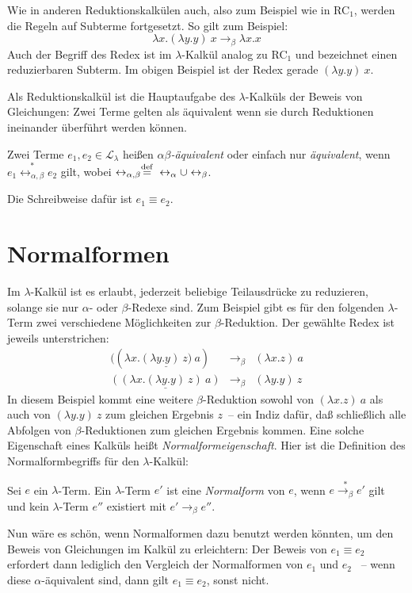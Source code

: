 Wie in anderen Reduktionskalkülen auch, also zum Beispiel wie in
RC$_1$, werden die Regeln auf Subterme fortgesetzt.  So gilt zum
Beispiel:
%
\begin{displaymath}
  \lambda x.(\lambda y.y)~x \rightarrow_{\beta} \lambda x.x
\end{displaymath}
%
Auch der Begriff des Redex ist im $\lambda$-Kalkül analog zu RC$_1$
und bezeichnet einen reduzierbaren Subterm.  Im obigen Beispiel ist
der Redex gerade $(\lambda y.y)~x$.

Als Reduktionskalkül ist die Hauptaufgabe des $\lambda$-Kalküls der
Beweis von Gleichungen: Zwei Terme gelten als äquivalent wenn
sie durch Reduktionen ineinander überführt werden können.
%
\begin{definition}
  Zwei Terme $e_1, e_2\in\mathcal{L}_{\lambda}$ heißen
  \textit{$\alpha\beta$-äquivalent} oder einfach nur
  \textit{äquivalent}, wenn
  \(e_1 \overset{\ast}{\leftrightarrow_{\alpha,\beta}} e_2\)
  gilt, wobei \(\leftrightarrow_{\alpha,\beta} \stackrel{\rm def}{=}{}
  \leftrightarrow_{\alpha} \cup \leftrightarrow_{\beta}\).

  Die Schreibweise dafür ist \(e_1\equiv e_2\).
\end{definition}

\section{Normalformen}
\label{sec:normalformen}

Im $\lambda$-Kalkül ist es erlaubt,
jederzeit beliebige Teilausdrücke zu reduzieren, solange sie nur
$\alpha$- oder $\beta$-Redexe sind.  Zum Beispiel gibt es für den
folgenden $\lambda$-Term zwei verschiedene Möglichkeiten zur
$\beta$-Reduktion.  Der gewählte Redex ist jeweils unterstrichen:
%
\begin{eqnarray*}
  ((\lambda x.\underline{(\lambda y.y)~z)}~a) &\rightarrow_{\beta}& (\lambda x.z)~a\\
  \underline{((\lambda x.(\lambda y.y)~z)~a)} &\rightarrow_{\beta}& (\lambda y.y)~z
\end{eqnarray*}
%
In diesem Beispiel kommt eine weitere
$\beta$-Reduktion sowohl von $(\lambda x.z)~a$ als auch von $(\lambda
y.y)~z$ zum gleichen Ergebnis $z$~-- ein Indiz
dafür, daß schließlich alle Abfolgen von $\beta$-Reduktionen zum
gleichen Ergebnis kommen.  Eine solche Eigenschaft eines Kalküls heißt
\textit{Normalformeigenschaft}.  Hier ist die Definition des
Normalformbegriffs für den $\lambda$-Kalkül:
%
\begin{definition}[Normalform]
  Sei $e$ ein $\lambda$-Term.  Ein $\lambda$-Term $e'$ ist eine
  \textit{Normalform} von $e$, wenn
  $e\overset{\ast}{\rightarrow_\beta}e'$ gilt und kein $\lambda$-Term
  $e''$ existiert mit
  $e'\rightarrow_\beta e''$.
\end{definition}
%
Nun wäre es schön, wenn Normalformen dazu benutzt werden könnten, um
den Beweis von Gleichungen im Kalkül zu erleichtern: Der Beweis von
$e_1 \equiv e_2$ erfordert dann lediglich den Vergleich der
Normalformen von $e_1$ und $e_2$ ~-- wenn diese
$\alpha$-äquivalent sind, dann gilt $e_1\equiv e_2$, sonst nicht.

